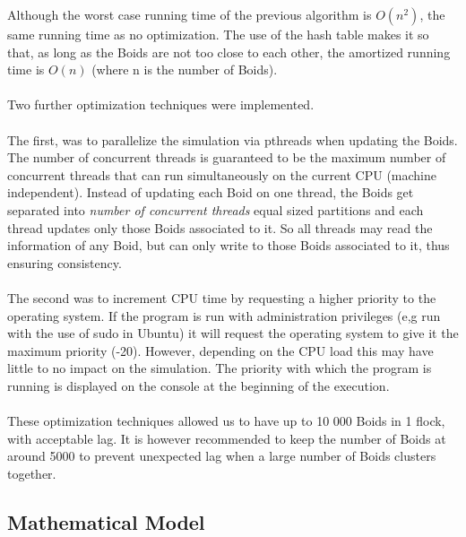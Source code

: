 \documentclass[12pt]{article}
\begin{document}
Although the worst case running time of the previous algorithm is $O(n^2)$, the same running time as no optimization. The use of the hash table makes it so that, as long as the Boids are not too close to each other, the amortized running time is $O(n)$ (where n is the number of Boids).
\\ \\

Two further optimization techniques were implemented. 
\\ \\
The first, was to parallelize the simulation via pthreads when updating the Boids. The number of concurrent threads is guaranteed to be the maximum number of concurrent threads that can run simultaneously on the current CPU (machine independent). Instead of updating each Boid on one thread, the Boids get separated into \textit{number of concurrent threads} equal sized partitions and each thread updates only those Boids associated to it. So all threads may read the information of any Boid, but can only write to those Boids associated to it, thus ensuring consistency.
\\ \\
The second was to increment CPU time by requesting a higher priority to the operating system. If the program is run with administration privileges (e,g run with the use of sudo in Ubuntu) it will request the operating system to give it the maximum priority (-20). However, depending on the CPU load this may have little to no impact on the simulation. The priority with which the program is running is displayed on the console at the beginning of the execution.
\\ \\
These optimization techniques allowed us to have up to 10 000 Boids in 1 flock, with acceptable lag. It is however recommended to keep the number of Boids at around 5000 to prevent unexpected lag when a large number of Boids clusters together.

\subsection{Mathematical Model}
\end{document}
